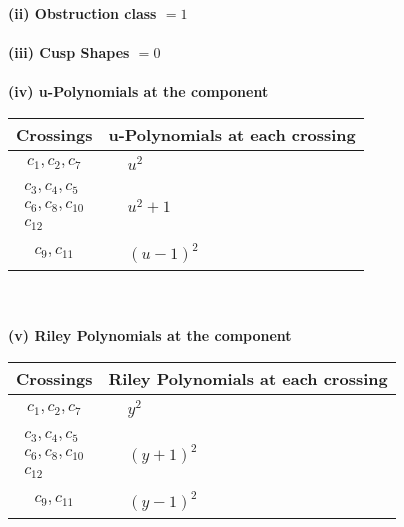 \documentclass[1p]{elsarticle_modified}
\theoremstyle{definition}
\begin{document}
\flushleft \textbf{(ii) Obstruction class $= 1$}\\~\\
\flushleft \textbf{(iii) Cusp Shapes $= 0$}\\~\\
\newpage\renewcommand{\arraystretch}{1}
\flushleft \textbf{(iv) u-Polynomials at the component}\newline \\
\begin{tabular}{m{50pt}|m{274pt}}
Crossings & \hspace{64pt}u-Polynomials at each crossing \\
\hline $$\begin{aligned}c_{1},c_{2},c_{7}\end{aligned}$$&$\begin{aligned}
&u^2
\end{aligned}$\\
\hline $$\begin{aligned}c_{3},c_{4},c_{5}\\c_{6},c_{8},c_{10}\\c_{12}\end{aligned}$$&$\begin{aligned}
&u^2+1
\end{aligned}$\\
\hline $$\begin{aligned}c_{9},c_{11}\end{aligned}$$&$\begin{aligned}
&(u-1)^2
\end{aligned}$\\
\hline
\end{tabular}\\~\\
\newpage\renewcommand{\arraystretch}{1}
\flushleft \textbf{(v) Riley Polynomials at the component}\newline \\
\begin{tabular}{m{50pt}|m{274pt}}
Crossings & \hspace{64pt}Riley Polynomials at each crossing \\
\hline $$\begin{aligned}c_{1},c_{2},c_{7}\end{aligned}$$&$\begin{aligned}
&y^2
\end{aligned}$\\
\hline $$\begin{aligned}c_{3},c_{4},c_{5}\\c_{6},c_{8},c_{10}\\c_{12}\end{aligned}$$&$\begin{aligned}
&(y+1)^2
\end{aligned}$\\
\hline $$\begin{aligned}c_{9},c_{11}\end{aligned}$$&$\begin{aligned}
&(y-1)^2
\end{aligned}$\\
\hline
\end{tabular}\\~\\
\end{document}
